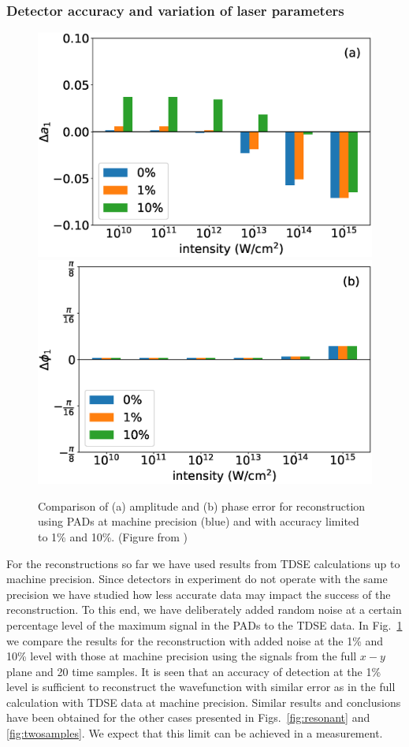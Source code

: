 \subsubsection{Detector accuracy and variation of laser parameters}

\begin{figure}[!ht]
\centering
\includegraphics[width=0.49\linewidth]{figs/Photo_ionization/superpositions/Venzke_new_fig_8a.eps}
\includegraphics[width=0.49\linewidth]{figs/Photo_ionization/superpositions/Venzke_new_fig_8b.eps}
\caption{
Comparison of (a) amplitude and (b) phase error for reconstruction using PADs at machine precision (blue) and with accuracy limited to 1\% and 10\%. (Figure from \cite{venzke2021_wave})
}
  \label{fig:detector}
\end{figure}

For the reconstructions so far
we have used results from TDSE calculations up to machine precision. Since detectors in experiment do not operate with the same precision we have studied how less accurate data may impact the success of the reconstruction. To this end, we have deliberately added random noise at a certain percentage level of the maximum signal in the PADs to the TDSE data. In Fig.\ \ref{fig:detector} we compare the results for the reconstruction with added noise at the  1\% and  10\% level with those at machine precision using the signals from the full $x-y$ plane and 20 time samples. It is seen that an accuracy of detection at the 1\% level is sufficient to reconstruct the wavefunction with similar error as in the full calculation with TDSE data at machine precision. Similar results and conclusions have been obtained for the other cases presented in Figs.\ \ref{fig:resonant} and \ref{fig:twosamples}. We expect that this limit can be achieved in a measurement.

